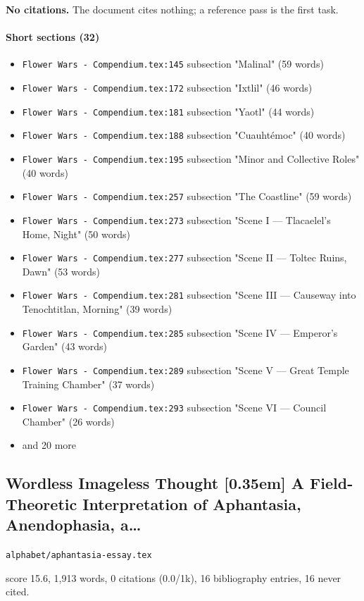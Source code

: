 \documentclass[11pt]{article}
\newcommand{\loc}[1]{{\small\color{muted}\texttt{#1}}}
\begin{document}
\textbf{No citations.} The document cites nothing; a reference pass is the first task.

\paragraph{Short sections (32)}
\begin{itemize}
\item \loc{Flower Wars - Compendium.tex:145} subsection "Malinal" (59 words)
\item \loc{Flower Wars - Compendium.tex:172} subsection "Ixtlil" (46 words)
\item \loc{Flower Wars - Compendium.tex:181} subsection "Yaotl" (44 words)
\item \loc{Flower Wars - Compendium.tex:188} subsection "Cuauhtémoc" (40 words)
\item \loc{Flower Wars - Compendium.tex:195} subsection "Minor and Collective Roles" (40 words)
\item \loc{Flower Wars - Compendium.tex:257} subsection "The Coastline" (59 words)
\item \loc{Flower Wars - Compendium.tex:273} subsection "Scene I --- Tlacaelel's Home, Night" (50 words)
\item \loc{Flower Wars - Compendium.tex:277} subsection "Scene II --- Toltec Ruins, Dawn" (53 words)
\item \loc{Flower Wars - Compendium.tex:281} subsection "Scene III --- Causeway into Tenochtitlan, Morning" (39 words)
\item \loc{Flower Wars - Compendium.tex:285} subsection "Scene IV --- Emperor's Garden" (43 words)
\item \loc{Flower Wars - Compendium.tex:289} subsection "Scene V --- Great Temple Training Chamber" (37 words)
\item \loc{Flower Wars - Compendium.tex:293} subsection "Scene VI --- Council Chamber" (26 words)
\item[] {\color{muted}\small and 20 more}
\end{itemize}
\subsection{Wordless Imageless Thought [0.35em] A Field-Theoretic Interpretation of Aphantasia, Anendophasia, a\ldots{}}
\loc{alphabet/\allowbreak{}aphantasia-essay.tex}\par
score 15.6, 1,913 words, 0 citations (0.0/1k), 16 bibliography entries, 16 never cited.
\end{document}
